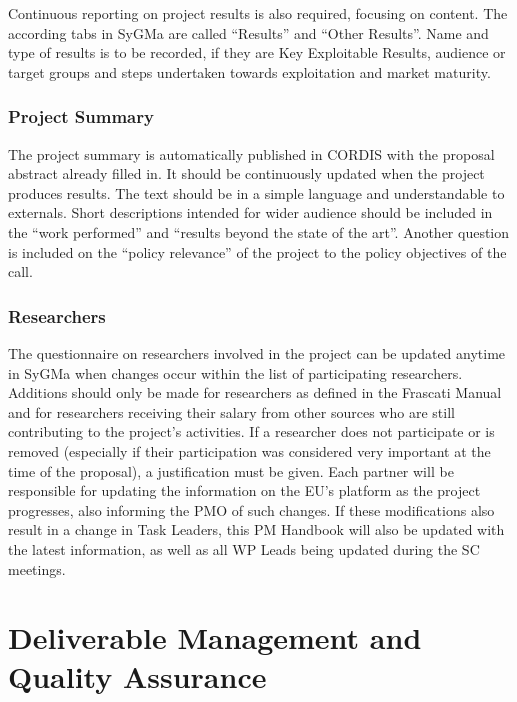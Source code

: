 \documentclass[
]{article}
\begin{document}
Continuous reporting on project results is also required, focusing on content. The according tabs in SyGMa are called ``Results'' and ``Other Results''. Name and type of results is to be recorded, if they are Key Exploitable Results, audience or target groups and steps undertaken towards exploitation and market maturity.

\hypertarget{project-summary}{%
\subsubsection{Project Summary}\label{project-summary}}

The project summary is automatically published in CORDIS with the proposal abstract already filled in. It should be continuously updated when the project produces results. The text should be in a simple language and understandable to externals. Short descriptions intended for wider audience should be included in the ``work performed'' and ``results beyond the state of the art''. Another question is included on the ``policy relevance'' of the project to the policy objectives of the call.

\hypertarget{researchers}{%
\subsubsection{Researchers}\label{researchers}}

The questionnaire on researchers involved in the project can be updated anytime in SyGMa when changes occur within the list of participating researchers. Additions should only be made for researchers as defined in the Frascati Manual and for researchers receiving their salary from other sources who are still contributing to the project's activities. If a researcher does not participate or is removed (especially if their participation was considered very important at the time of the proposal), a justification must be given. Each partner will be responsible for updating the information on the EU's platform as the project progresses, also informing the PMO of such changes. If these modifications also result in a change in Task Leaders, this PM Handbook will also be updated with the latest information, as well as all WP Leads being updated during the SC meetings.

\hypertarget{deliverable-management-and-quality-assurance}{%
\section{\texorpdfstring{\textbf{Deliverable Management and Quality Assurance}}{Deliverable Management and Quality Assurance}}\label{deliverable-management-and-quality-assurance}}
\end{document}

